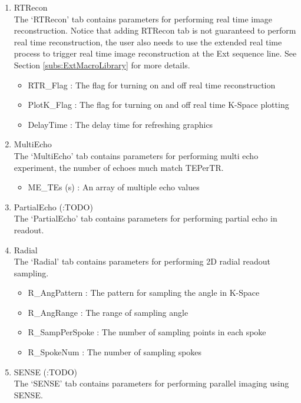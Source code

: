 \documentclass{book}%
\begin{document}
\begin{enumerate}
	\item RTRecon \\
	The `RTRecon' tab contains parameters for performing real time image reconstruction. Notice that adding RTRecon tab is not guaranteed to perform real time reconstruction, the user also needs to use the extended real time process to trigger real time image reconstruction at the Ext sequence line. See Section \ref{subs:ExtMacroLibrary} for more details.
	\begin{itemize}
		\item RTR\_Flag : The flag for turning on and off real time reconstruction
		\item PlotK\_Flag : The flag for turning on and off real time K-Space plotting
		\item DelayTime : The delay time for refreshing graphics
	\end{itemize}
		
  \item MultiEcho \\
	The `MultiEcho' tab contains parameters for performing multi echo experiment, the number of echoes much match TEPerTR.
		\begin{itemize}
			\item ME\_TEs (s) : An array of multiple echo values
		\end{itemize}
	
	\item PartialEcho (:TODO) \\
	The `PartialEcho' tab contains parameters for performing partial echo in readout.
	
	\item Radial \\
	The `Radial' tab contains parameters for performing 2D radial readout sampling.
		\begin{itemize}
			\item R\_AngPattern : The pattern for sampling the angle in K-Space
			\item R\_AngRange : The range of sampling angle
			\item R\_SampPerSpoke : The number of sampling points in each spoke
			\item R\_SpokeNum : The number of sampling spokes
		\end{itemize}
	
  \item SENSE (:TODO) \\
	The `SENSE' tab contains parameters for performing parallel imaging using SENSE.
	

\end{enumerate}
\end{document}
